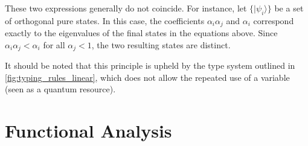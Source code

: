 These two expressions generally do not coincide. For instance, let $\{|\psi_i\rangle\}$ be a set of orthogonal pure states. In this case, the coefficients $\alpha_i \alpha_j $ and $\alpha_i$ correspond exactly to the eigenvalues of the final states in the equations above. Since $ \alpha_i \alpha_j < \alpha_i$ for all $\alpha_j< 1$, the two resulting states are distinct.

It should be noted that this principle is upheld by the type system outlined in \autoref{fig:typing_rules_linear}, which does not allow the repeated use of a variable (seen as a quantum resource).




\section{Functional Analysis}

